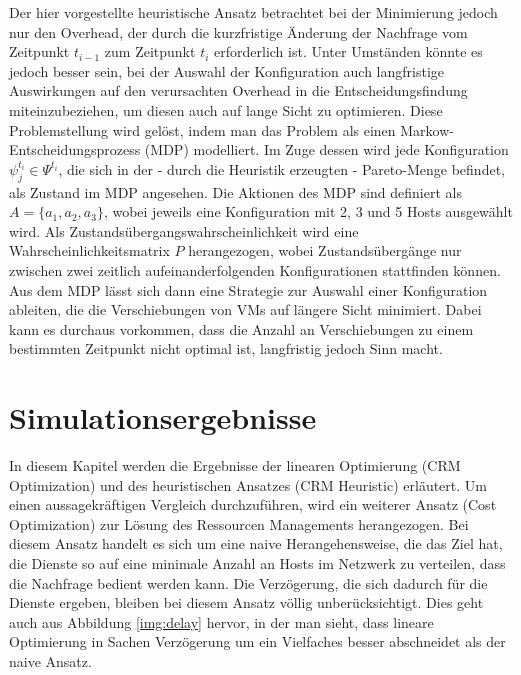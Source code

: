 \documentclass[conference]{IEEEtran}
\begin{document}
Der hier vorgestellte heuristische Ansatz betrachtet bei der Minimierung jedoch nur den Overhead, der durch die kurzfristige Änderung der Nachfrage vom Zeitpunkt \(t_{i-1}\) zum Zeitpunkt \(t_i\) erforderlich ist. Unter Umständen könnte es jedoch besser sein, bei der Auswahl der Konfiguration auch langfristige Auswirkungen auf den verursachten Overhead in die Entscheidungsfindung miteinzubeziehen, um diesen auch auf lange Sicht zu optimieren.
Diese Problemstellung wird gelöst, indem man das Problem als einen Markow-Entscheidungsprozess (MDP) modelliert. Im Zuge dessen wird jede Konfiguration \(\psi_j^{t_i} \in \Psi^{t_i}\), die sich in der - durch die Heuristik erzeugten - Pareto-Menge befindet, als Zustand im MDP angesehen. Die Aktionen des MDP sind definiert als 
\(A=\{a_1,a_2,a_3\}\), wobei jeweils eine Konfiguration mit 2, 3 und 5 Hosts ausgewählt wird.  Als Zustandsübergangswahrscheinlichkeit wird eine Wahrscheinlichkeitsmatrix \(P\) herangezogen, wobei Zustandsübergänge nur zwischen zwei zeitlich aufeinanderfolgenden Konfigurationen stattfinden können.
Aus dem MDP lässt sich dann eine Strategie zur Auswahl einer Konfiguration ableiten, die die Verschiebungen von VMs auf längere Sicht minimiert. Dabei kann es durchaus vorkommen, dass die Anzahl an Verschiebungen zu einem bestimmten Zeitpunkt nicht optimal ist, langfristig jedoch Sinn macht.


\section{Simulationsergebnisse}

In diesem Kapitel werden die Ergebnisse der linearen Optimierung (CRM Optimization) und des heuristischen Ansatzes (CRM Heuristic) erläutert. Um einen aussagekräftigen Vergleich durchzuführen, wird ein weiterer Ansatz (Cost Optimization) zur Lösung des Ressourcen Managements herangezogen. Bei diesem Ansatz handelt es sich um eine naive Herangehensweise, die das Ziel hat, die Dienste so auf eine minimale Anzahl an Hosts im Netzwerk zu verteilen, dass die Nachfrage bedient werden kann. Die Verzögerung, die sich dadurch für die Dienste ergeben, bleiben bei diesem Ansatz völlig unberücksichtigt. Dies geht auch aus Abbildung \ref{img:delay} hervor, in der man sieht, dass lineare Optimierung in Sachen Verzögerung um ein Vielfaches besser abschneidet als der naive Ansatz.  
\end{document}
